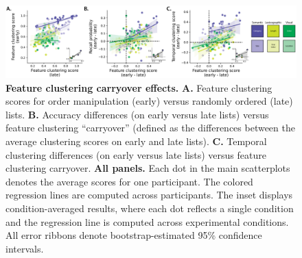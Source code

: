 \documentclass[11pt]{article}
\begin{document}
\begin{figure}[tp] \centering
    \includegraphics[width=\textwidth]{figures/clustering_carryover}
    
    \caption{\textbf{Feature clustering carryover effects.} \textbf{A.} Feature
    clustering scores for order manipulation (early) versus randomly ordered
    (late) lists. \textbf{B.} Accuracy differences (on early versus late lists)
    versus feature clustering ``carryover'' (defined as the differences between
    the average clustering scores on early and late lists). \textbf{C.}
    Temporal clustering differences (on early versus late lists) versus feature
    clustering carryover. \textbf{All panels.} Each dot in the main
    scatterplots denotes the average scores for one participant. The colored
    regression lines are computed across participants. The inset displays
    condition-averaged results, where each dot reflects a single condition and
    the regression line is computed across experimental conditions. All error
    ribbons denote bootstrap-estimated 95\% confidence intervals.}
    \label{fig:clustering-carryover} 

\end{figure}
\end{document}

